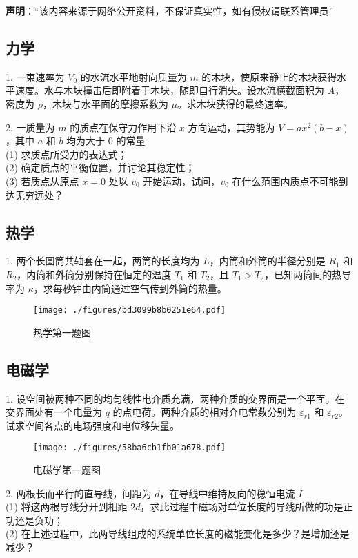
\textbf{声明}：“该内容来源于网络公开资料，不保证真实性，如有侵权请联系管理员”

\subsection{力学}
1. 一束速率为 $V_{0}$ 的水流水平地射向质量为 $m$ 的木块，使原来静止的木块获得水平速度。水与木块撞击后即附着于木块，随即自行消失。设水流横截面积为 $A$，密度为 $\rho$，木块与水平面的摩擦系数为 $\mu$。求木块获得的最终速率。

2. 一质量为 $m$ 的质点在保守力作用下沿 $x$ 方向运动，其势能为 $V=a x^{2}(b-x)$，其中 $a$ 和 $b$ 均为大于 0 的常量\\
(1) 求质点所受力的表达式；\\
(2) 确定质点的平衡位置，并讨论其稳定性；\\
(3) 若质点从原点 $x=0$ 处以 $v_{0}$ 开始运动，试问，$v_{0}$ 在什么范围内质点不可能到达无穷远处？
\subsection{热学}
1. 两个长圆筒共轴套在一起，两筒的长度均为 $L$，内筒和外筒的半径分别是 $R_{1}$ 和 $R_{2}$，内筒和外筒分别保持在恒定的温度 $T_{1}$ 和 $T_{2}$，且 $T_{1}>T_{2}$，已知两筒间的热导率为 $\kappa$，求每秒钟由内筒通过空气传到外筒的热量。
\begin{figure}[ht]
\centering
\texttt{[image: ./figures/bd3099b8b0251e64.pdf]}
\caption{热学第一题图} \label{fig_NJU16_1}
\end{figure}
\subsection{电磁学}
1. 设空间被两种不同的均匀线性电介质充满，两种介质的交界面是一个平面。在交界面处有一个电量为 $q$ 的点电荷。两种介质的相对介电常数分别为 $\varepsilon_{r 1}$ 和 $\varepsilon_{r 2}$。试求空间各点的电场强度和电位移矢量。
\begin{figure}[ht]
\centering
\texttt{[image: ./figures/58ba6cb1fb01a678.pdf]}
\caption{电磁学第一题图} \label{fig_NJU16_2}
\end{figure}
2. 两根长而平行的直导线，间距为 $d$，在导线中维持反向的稳恒电流 $I$\\
(1) 将这两根导线分开到相距 $2 d$，求此过程中磁场对单位长度的导线所做的功是正功还是负功；\\
(2) 在上述过程中，此两导线组成的系统单位长度的磁能变化是多少？是增加还是减少？
